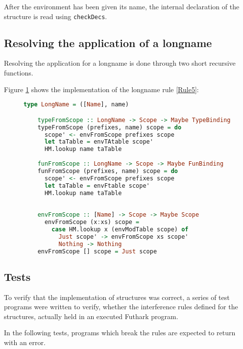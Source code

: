 After the environment has been given its name, the internal declaration of the
structure is read using \texttt{checkDecs}.

\subsection{Resolving the application of a longname}
Resolving the application for a longname is done through two short recursive
functions.

Figure \ref{resolvelongname} shows the implementation of the longname rule
\ref{Rule5}:
\begin{figure}\label{resolvelongname}
  \begin{lstlisting}[language=Haskell]
    type LongName = ([Name], name)

    typeFromScope :: LongName -> Scope -> Maybe TypeBinding
    typeFromScope (prefixes, name) scope = do
      scope' <- envFromScope prefixes scope
      let taTable = envTAtable scope'
      HM.lookup name taTable
    
    funFromScope :: LongName -> Scope -> Maybe FunBinding
    funFromScope (prefixes, name) scope = do
      scope' <- envFromScope prefixes scope
      let taTable = envFtable scope'
      HM.lookup name taTable
    
    
    envFromScope :: [Name] -> Scope -> Maybe Scope
      envFromScope (x:xs) scope =
        case HM.lookup x (envModTable scope) of
          Just scope' -> envFromScope xs scope'
          Nothing -> Nothing
    envFromScope [] scope = Just scope
\end{lstlisting}
\end{figure}

\subsection{Tests}
\label{subsec:structuretests}
To verify that the implementation of structures was correct, a series of test
programs were written to verify, whether the interference rules defined for the
structures, actually held in an executed Futhark program.

In the following tests, programs which break the rules are expected to return
with an error.

